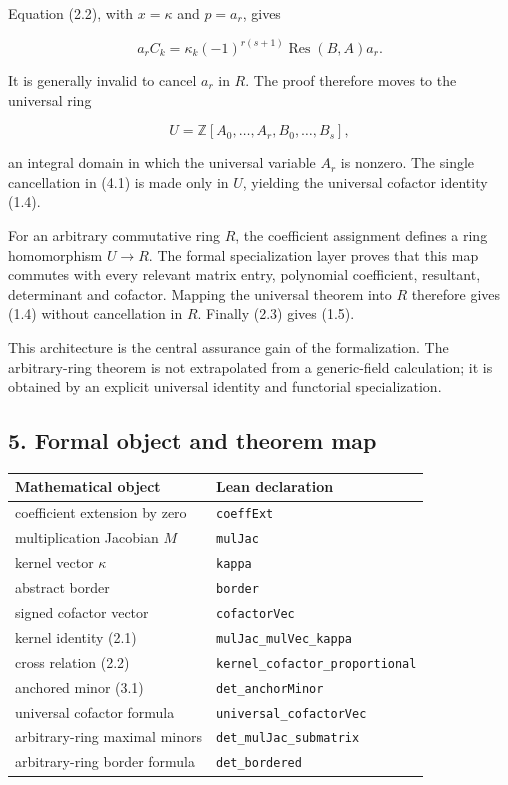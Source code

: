 \documentclass[
  11pt,
  a4paper,
]{article}
\newcounter{none} %
\begin{document}
Equation (2.2), with \(x=\kappa\) and \(p=a_r\), gives

\[
a_rC_k
=\kappa_k(-1)^{r(s+1)}\operatorname{Res}(B,A)a_r.
\tag{4.1}
\]

It is generally invalid to cancel \(a_r\) in \(R\). The proof therefore
moves to the universal ring

\[
U=\mathbb Z[A_0,\ldots,A_r,B_0,\ldots,B_s],
\]

an integral domain in which the universal variable \(A_r\) is nonzero.
The single cancellation in (4.1) is made only in \(U\), yielding the
universal cofactor identity (1.4).

For an arbitrary commutative ring \(R\), the coefficient assignment
defines a ring homomorphism \(U\to R\). The formal specialization layer
proves that this map commutes with every relevant matrix entry,
polynomial coefficient, resultant, determinant and cofactor. Mapping the
universal theorem into \(R\) therefore gives (1.4) without cancellation
in \(R\). Finally (2.3) gives (1.5).

This architecture is the central assurance gain of the formalization.
The arbitrary-ring theorem is not extrapolated from a generic-field
calculation; it is obtained by an explicit universal identity and
functorial specialization.

\subsection{5. Formal object and theorem
map}\label{formal-object-and-theorem-map}

{\def\LTcaptype{none} %
\begin{longtable}[]{@{}ll@{}}
\toprule\noalign{}
Mathematical object & Lean declaration \\
\midrule\noalign{}
\endhead
\bottomrule\noalign{}
\endlastfoot
coefficient extension by zero & \texttt{coeffExt} \\
multiplication Jacobian \(M\) & \texttt{mulJac} \\
kernel vector \(\kappa\) & \texttt{kappa} \\
abstract border & \texttt{border} \\
signed cofactor vector & \texttt{cofactorVec} \\
kernel identity (2.1) & \texttt{mulJac\_mulVec\_kappa} \\
cross relation (2.2) & \texttt{kernel\_cofactor\_proportional} \\
anchored minor (3.1) & \texttt{det\_anchorMinor} \\
universal cofactor formula & \texttt{universal\_cofactorVec} \\
arbitrary-ring maximal minors & \texttt{det\_mulJac\_submatrix} \\
arbitrary-ring border formula & \texttt{det\_bordered} \\
\end{longtable}
}
\end{document}
